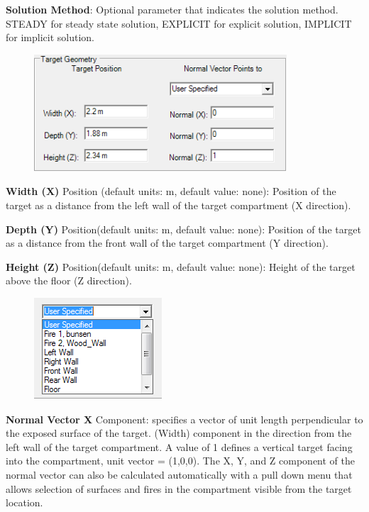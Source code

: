 \textbf{Solution Method}: Optional parameter that indicates the solution method. STEADY for steady state solution, EXPLICIT for explicit solution, IMPLICIT for implicit solution.


\begin{figure}
  \includegraphics[width=3.713in]{FIGURES/Input_File/Target_Geometry}
\end{figure}

\textbf{Width (X)} Position (default units: m, default value: none): Position of the target as a distance from the left wall of the target compartment (X direction).

\textbf{Depth (Y)} Position(default units: m, default value: none): Position of the target as a distance from the front wall of the target compartment (Y direction).

\textbf{Height (Z)} Position(default units: m, default value: none): Height of the target above the floor (Z direction).

\begin{figure}
  \includegraphics[width=1.875in]{FIGURES/Input_File/Target_Points_To}
\end{figure}

\textbf{Normal Vector X} Component: specifies a vector of unit length perpendicular to the exposed surface of the target. (Width) component in the direction from the left wall of the target compartment. A value of 1 defines a vertical target facing into the compartment, unit vector = (1,0,0). The X, Y, and Z component of the normal vector can also be calculated automatically with a pull down menu that allows selection of surfaces and fires in the compartment visible from the target location.


